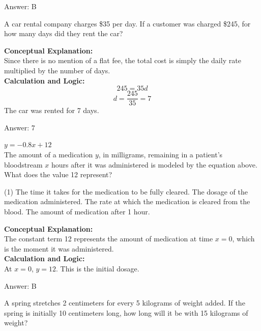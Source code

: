 \documentclass[11pt,paper=a4,answers]{exam}
\begin{document}
\begin{questions}
\begin{solution}
\vspace{15pt}
Answer: \colorbox{yellow!100}{B}
\end{solution}

\question
A car rental company charges \$35 per day. If a customer was charged \$245, for how many days did they rent the car?

\begin{solution}
\textbf{Conceptual Explanation:} \\
Since there is no mention of a flat fee, the total cost is simply the daily rate multiplied by the number of days.
\\[10pt]
\textbf{Calculation and Logic:} \\
\[245 = 35d\]
\[d = \frac{245}{35} = 7\]
The car was rented for 7 days.

\vspace{15pt}
Answer: \colorbox{yellow!100}{7}
\end{solution}

\question
$y = -0.8x + 12$ \\
The amount of a medication $y$, in milligrams, remaining in a patient's bloodstream $x$ hours after it was administered is modeled by the equation above. What does the value 12 represent?
\begin{tasks}(1)
    \task The time it takes for the medication to be fully cleared.
    \task The dosage of the medication administered.
    \task The rate at which the medication is cleared from the blood.
    \task The amount of medication after 1 hour.
\end{tasks}

\begin{solution}
\textbf{Conceptual Explanation:} \\
The constant term 12 represents the amount of medication at time $x=0$, which is the moment it was administered.
\\[10pt]
\textbf{Calculation and Logic:} \\
At $x = 0$, $y = 12$. This is the initial dosage.

\vspace{15pt}
Answer: \colorbox{yellow!100}{B}
\end{solution}

\question
A spring stretches 2 centimeters for every 5 kilograms of weight added. If the spring is initially 10 centimeters long, how long will it be with 15 kilograms of weight?


\end{questions}
\end{document}
